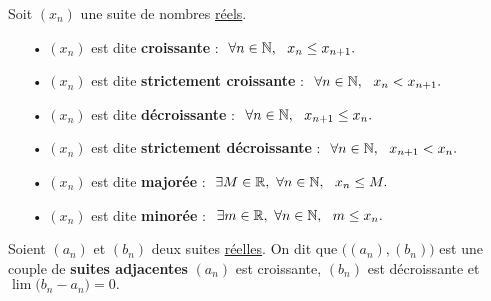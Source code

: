 \vspace{1.5cm}

\noindent Soit $(x_n)$ une suite de nombres \underline{réels}.\vspace{0.1cm}
\begin{itemize}[leftmargin=1cm]
    \item[•] $(x_n)$ est dite \textbf{croissante} \ssi : \(\ \forall n\in \NN,\ \ x_n \leq x_{n+1}.  \)\vspace{0.1cm}
    
    \item[•] $(x_n)$ est dite \textbf{strictement croissante} \ssi : \(\ \forall n\in \mathbb{N},\ \ x_n < x_{n+1}.  \)\vspace{0.1cm}

    \item[•] $(x_n)$ est dite \textbf{décroissante} \ssi : \(\ \forall n\in \NN,\ \ x_{n+1} \leq x_n.  \)\vspace{0.1cm}
    
    \item[•] $(x_n)$ est dite \textbf{strictement décroissante} \ssi : \(\ \forall n\in \mathbb{N},\ \ x_{n+1} < x_n.  \)\vspace{0.1cm}

    \item[•] $(x_n)$ est dite \textbf{majorée} \ssi : \(\ \exists M\in \mathbb{R},\ \forall n\in \mathbb{N},\ \ x_n \leq M.  \)\vspace{0.1cm}

    \item[•] $(x_n)$ est dite \textbf{minorée} \ssi : \(\ \exists m\in \mathbb{R},\ \forall n\in \mathbb{N},\ \ m\leq x_n .  \)
\end{itemize}

\vspace{1.3cm}

Soient $(a_n)$ et $(b_n)$ deux suites \underline{réelles}. On dit que \(\bigl((a_n),(b_n)\bigr)\) est une couple de \textbf{suites adjacentes} \ssi $(a_n)$ est croissante, $(b_n)$ est décroissante et \(\displaystyle \lim \bigl(b_n-a_n\bigr)=0.\)


\vspace{1.3cm}

